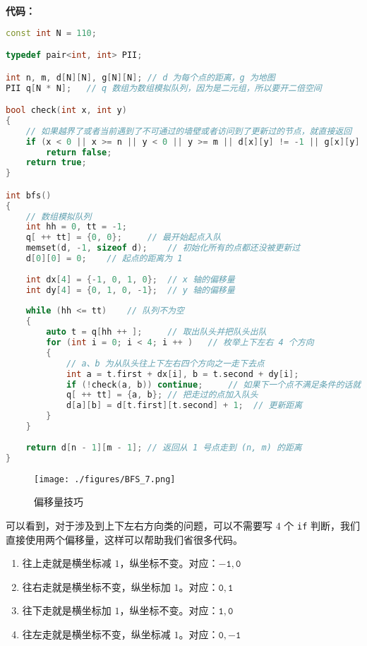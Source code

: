 \textbf{代码：}
\begin{lstlisting}[language=cpp]
const int N = 110;

typedef pair<int, int> PII;

int n, m, d[N][N], g[N][N]; // d 为每个点的距离，g 为地图
PII q[N * N];   // q 数组为数组模拟队列，因为是二元组，所以要开二倍空间

bool check(int x, int y)
{
    // 如果越界了或者当前遇到了不可通过的墙壁或者访问到了更新过的节点，就直接返回
    if (x < 0 || x >= n || y < 0 || y >= m || d[x][y] != -1 || g[x][y] == 1) 
        return false;
    return true;
}

int bfs()
{
    // 数组模拟队列
    int hh = 0, tt = -1;
    q[ ++ tt] = {0, 0};     // 最开始起点入队
    memset(d, -1, sizeof d);    // 初始化所有的点都还没被更新过
    d[0][0] = 0;    // 起点的距离为 1
    
    int dx[4] = {-1, 0, 1, 0};  // x 轴的偏移量
    int dy[4] = {0, 1, 0, -1};  // y 轴的偏移量
    
    while (hh <= tt)    // 队列不为空
    {
        auto t = q[hh ++ ];     // 取出队头并把队头出队
        for (int i = 0; i < 4; i ++ )   // 枚举上下左右 4 个方向
        {
            // a、b 为从队头往上下左右四个方向之一走下去点
            int a = t.first + dx[i], b = t.second + dy[i];   
            if (!check(a, b)) continue;     // 如果下一个点不满足条件的话就往下一个方向走
            q[ ++ tt] = {a, b}; // 把走过的点加入队头
            d[a][b] = d[t.first][t.second] + 1;  // 更新距离
        }
    }
    
    return d[n - 1][m - 1]; // 返回从 1 号点走到 (n, m) 的距离
}  
\end{lstlisting}

\begin{figure}[ht]
\centering
\texttt{[image: ./figures/BFS\_7.png]}
\caption{偏移量技巧} \label{BFS_fig7}
\end{figure}

可以看到，对于涉及到上下左右方向类的问题，可以不需要写 $4$ 个 \verb|if| 判断，我们直接使用两个偏移量，这样可以帮助我们省很多代码。

\begin{enumerate}
\item 往上走就是横坐标减 $1$，纵坐标不变。对应：$\mathtt{-1, 0}$
\item 往右走就是横坐标不变，纵坐标加 $1$。对应：$\mathtt{0, 1}$
\item 往下走就是横坐标加 $1$，纵坐标不变。对应：$\mathtt{1, 0}$
\item 往左走就是横坐标不变，纵坐标减 $1$。对应：$\mathtt{0, -1}$
\end{enumerate}

